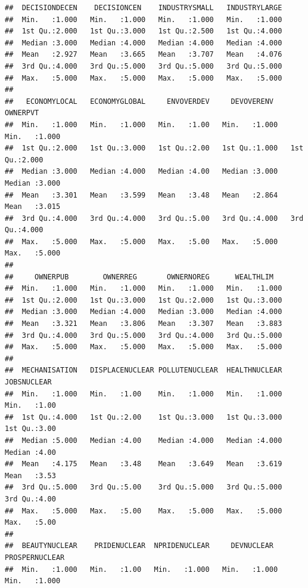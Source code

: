 \documentclass[
]{article}
\begin{document}
\begin{verbatim}
##  DECISIONDECEN    DECISIONCEN    INDUSTRYSMALL   INDUSTRYLARGE  
##  Min.   :1.000   Min.   :1.000   Min.   :1.000   Min.   :1.000  
##  1st Qu.:2.000   1st Qu.:3.000   1st Qu.:2.500   1st Qu.:4.000  
##  Median :3.000   Median :4.000   Median :4.000   Median :4.000  
##  Mean   :2.927   Mean   :3.665   Mean   :3.707   Mean   :4.076  
##  3rd Qu.:4.000   3rd Qu.:5.000   3rd Qu.:5.000   3rd Qu.:5.000  
##  Max.   :5.000   Max.   :5.000   Max.   :5.000   Max.   :5.000  
##                                                                 
##   ECONOMYLOCAL   ECONOMYGLOBAL     ENVOVERDEV     DEVOVERENV       OWNERPVT    
##  Min.   :1.000   Min.   :1.000   Min.   :1.00   Min.   :1.000   Min.   :1.000  
##  1st Qu.:2.000   1st Qu.:3.000   1st Qu.:2.00   1st Qu.:1.000   1st Qu.:2.000  
##  Median :3.000   Median :4.000   Median :4.00   Median :3.000   Median :3.000  
##  Mean   :3.301   Mean   :3.599   Mean   :3.48   Mean   :2.864   Mean   :3.015  
##  3rd Qu.:4.000   3rd Qu.:4.000   3rd Qu.:5.00   3rd Qu.:4.000   3rd Qu.:4.000  
##  Max.   :5.000   Max.   :5.000   Max.   :5.00   Max.   :5.000   Max.   :5.000  
##                                                                                
##     OWNERPUB        OWNERREG       OWNERNOREG      WEALTHLIM    
##  Min.   :1.000   Min.   :1.000   Min.   :1.000   Min.   :1.000  
##  1st Qu.:2.000   1st Qu.:3.000   1st Qu.:2.000   1st Qu.:3.000  
##  Median :3.000   Median :4.000   Median :3.000   Median :4.000  
##  Mean   :3.321   Mean   :3.806   Mean   :3.307   Mean   :3.883  
##  3rd Qu.:4.000   3rd Qu.:5.000   3rd Qu.:4.000   3rd Qu.:5.000  
##  Max.   :5.000   Max.   :5.000   Max.   :5.000   Max.   :5.000  
##                                                                 
##  MECHANISATION   DISPLACENUCLEAR POLLUTENUCLEAR  HEALTHNUCLEAR    JOBSNUCLEAR  
##  Min.   :1.000   Min.   :1.00    Min.   :1.000   Min.   :1.000   Min.   :1.00  
##  1st Qu.:4.000   1st Qu.:2.00    1st Qu.:3.000   1st Qu.:3.000   1st Qu.:3.00  
##  Median :5.000   Median :4.00    Median :4.000   Median :4.000   Median :4.00  
##  Mean   :4.175   Mean   :3.48    Mean   :3.649   Mean   :3.619   Mean   :3.53  
##  3rd Qu.:5.000   3rd Qu.:5.00    3rd Qu.:5.000   3rd Qu.:5.000   3rd Qu.:4.00  
##  Max.   :5.000   Max.   :5.00    Max.   :5.000   Max.   :5.000   Max.   :5.00  
##                                                                                
##  BEAUTYNUCLEAR    PRIDENUCLEAR  NPRIDENUCLEAR     DEVNUCLEAR    PROSPERNUCLEAR 
##  Min.   :1.000   Min.   :1.00   Min.   :1.000   Min.   :1.000   Min.   :1.000  

\end{verbatim}
\end{document}

